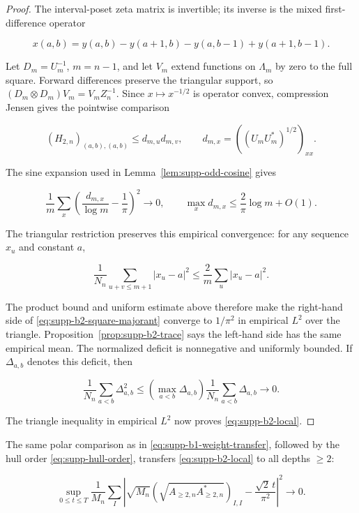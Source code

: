 \begin{proof}
The interval-poset zeta matrix is invertible; its inverse is the mixed
first-difference operator

\[
 x(a,b)=y(a,b)-y(a+1,b)-y(a,b-1)+y(a+1,b-1).
\]

Let \(D_m=U_m^{-1}\), \(m=n-1\), and let \(V_m\) extend functions on
\(\Lambda_m\) by zero to the full square.  Forward differences preserve the
triangular support, so
\((D_m\otimes D_m)V_m=V_mZ_n^{-1}\).  Since \(x\mapsto x^{-1/2}\) is
operator convex, compression Jensen gives the pointwise comparison

\begin{equation}\label{eq:supp-b2-square-majorant}
 (H_{2,n})_{(a,b),(a,b)}
 \le d_{m,u}d_{m,v},
 \qquad
 d_{m,x}=((U_mU_m^*)^{1/2})_{xx}.
\end{equation}

The sine expansion used in Lemma~\ref{lem:supp-odd-cosine} gives

\[
 \frac1m\sum_x\left(\frac{d_{m,x}}{\log m}-\frac1\pi\right)^2\to0,
 \qquad
 \max_xd_{m,x}\le\frac2\pi\log m+O(1).
\]

The triangular restriction preserves this empirical convergence: for any
sequence \(x_u\) and constant \(a\),

\[
 \frac1{N_n}\sum_{u+v\le m+1}|x_u-a|^2
 \le \frac2m\sum_u|x_u-a|^2.
\]

The product bound and uniform estimate above therefore make the right-hand
side of \eqref{eq:supp-b2-square-majorant} converge to \(1/\pi^2\) in
empirical \(L^2\) over the triangle.  Proposition~\ref{prop:supp-b2-trace} says the
left-hand side has the same empirical mean.  The normalized deficit is
nonnegative and uniformly bounded. If \(\Delta_{a,b}\) denotes this deficit,
then

\[
 \frac1{N_n}\sum_{a<b}\Delta_{a,b}^2
 \le \left(\max_{a<b}\Delta_{a,b}\right)
 \frac1{N_n}\sum_{a<b}\Delta_{a,b}\longrightarrow0.
\]

The triangle inequality in empirical \(L^2\) now proves
\eqref{eq:supp-b2-local}.
\end{proof}

The same polar comparison as in \eqref{eq:supp-b1-weight-transfer}, followed
by the hull order \eqref{eq:supp-hull-order}, transfers
\eqref{eq:supp-b2-local} to all depths \(\ge2\):

\begin{equation}\label{eq:supp-physical-b2-local}
 \sup_{0\le t\le T}\frac1{M_n}\sum_I
 \left|\sqrt{M_n}(\sqrt{A_{\ge2,n}A_{\ge2,n}^*})_{I,I}
 -\frac{\sqrt2\,t}{\pi^2}\right|^2\longrightarrow0.
\end{equation}

